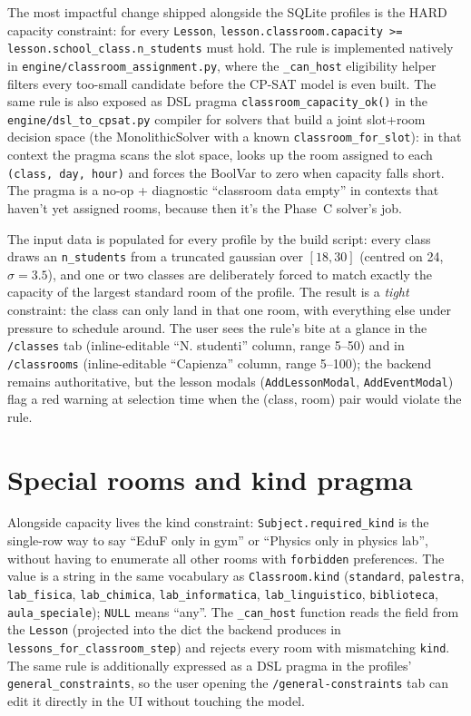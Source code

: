 The most impactful change shipped alongside the SQLite profiles
is the HARD capacity constraint: for every \texttt{Lesson},
\texttt{lesson.classroom.capacity >= lesson.school\_class.n\_students}
must hold. The rule is implemented natively in
\texttt{engine/classroom\_assignment.py}, where the
\texttt{\_can\_host} eligibility helper filters every too-small
candidate before the CP-SAT model is even built. The same rule is
also exposed as DSL pragma \texttt{classroom\_capacity\_ok()} in
the \texttt{engine/dsl\_to\_cpsat.py} compiler for solvers that
build a joint slot+room decision space (the MonolithicSolver with
a known \texttt{classroom\_for\_slot}): in that context the
pragma scans the slot space, looks up the room assigned to each
\texttt{(class, day, hour)} and forces the BoolVar to zero when
capacity falls short. The pragma is a no-op + diagnostic
``classroom data empty'' in contexts that haven't yet assigned
rooms, because then it's the Phase~C solver's job.

The input data is populated for every profile by the build
script: every class draws an \texttt{n\_students} from a truncated
gaussian over $[18, 30]$ (centred on 24, $\sigma=3.5$), and one
or two classes are deliberately forced to match exactly the
capacity of the largest standard room of the profile. The result
is a \emph{tight} constraint: the class can only land in that one
room, with everything else under pressure to schedule around. The
user sees the rule's bite at a glance in the \texttt{/classes}
tab (inline-editable ``N. studenti'' column, range 5--50) and in
\texttt{/classrooms} (inline-editable ``Capienza'' column, range
5--100); the backend remains authoritative, but the lesson
modals (\texttt{AddLessonModal}, \texttt{AddEventModal}) flag a
red warning at selection time when the (class, room) pair would
violate the rule.

\section{Special rooms and kind pragma}

Alongside capacity lives the kind constraint:
\texttt{Subject.required\_kind} is the single-row way to say
``EduF only in gym'' or ``Physics only in physics lab'', without
having to enumerate all other rooms with \texttt{forbidden}
preferences. The value is a string in the same vocabulary as
\texttt{Classroom.kind} (\texttt{standard}, \texttt{palestra},
\texttt{lab\_fisica}, \texttt{lab\_chimica},
\texttt{lab\_informatica}, \texttt{lab\_linguistico},
\texttt{biblioteca}, \texttt{aula\_speciale}); \texttt{NULL}
means ``any''. The \texttt{\_can\_host} function reads the field
from the \texttt{Lesson} (projected into the dict the backend
produces in \texttt{lessons\_for\_classroom\_step}) and rejects
every room with mismatching \texttt{kind}. The same rule is
additionally expressed as a DSL pragma in the profiles'
\texttt{general\_constraints}, so the user opening the
\texttt{/general-constraints} tab can edit it directly in the UI
without touching the model.

